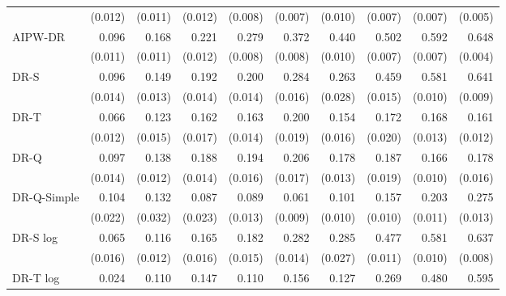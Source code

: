 \documentclass{article}
\begin{document}
\begin{table}[H]
\begin{tabular}{l|rrrrrrrrr}
 & \scriptsize (0.012) & \scriptsize (0.011) & \scriptsize (0.012) & \scriptsize (0.008) & \scriptsize (0.007) & \scriptsize (0.010) & \scriptsize (0.007) & \scriptsize (0.007) & \scriptsize (0.005) \\[2pt]
AIPW-DR & 0.096 & 0.168 & 0.221 & 0.279 & 0.372 & 0.440 & 0.502 & 0.592 & 0.648 \\
 & \scriptsize (0.011) & \scriptsize (0.011) & \scriptsize (0.012) & \scriptsize (0.008) & \scriptsize (0.008) & \scriptsize (0.010) & \scriptsize (0.007) & \scriptsize (0.007) & \scriptsize (0.004) \\[2pt]
\hline
DR-S & 0.096 & 0.149 & 0.192 & 0.200 & 0.284 & 0.263 & 0.459 & 0.581 & 0.641 \\
 & \scriptsize (0.014) & \scriptsize (0.013) & \scriptsize (0.014) & \scriptsize (0.014) & \scriptsize (0.016) & \scriptsize (0.028) & \scriptsize (0.015) & \scriptsize (0.010) & \scriptsize (0.009) \\[2pt]
DR-T & 0.066 & 0.123 & 0.162 & 0.163 & 0.200 & 0.154 & 0.172 & 0.168 & 0.161 \\
 & \scriptsize (0.012) & \scriptsize (0.015) & \scriptsize (0.017) & \scriptsize (0.014) & \scriptsize (0.019) & \scriptsize (0.016) & \scriptsize (0.020) & \scriptsize (0.013) & \scriptsize (0.012) \\[2pt]
DR-Q & 0.097 & 0.138 & 0.188 & 0.194 & 0.206 & 0.178 & 0.187 & 0.166 & 0.178 \\
 & \scriptsize (0.014) & \scriptsize (0.012) & \scriptsize (0.014) & \scriptsize (0.016) & \scriptsize (0.017) & \scriptsize (0.013) & \scriptsize (0.019) & \scriptsize (0.010) & \scriptsize (0.016) \\[2pt]
DR-Q-Simple & 0.104 & 0.132 & 0.087 & 0.089 & 0.061 & 0.101 & 0.157 & 0.203 & 0.275 \\
 & \scriptsize (0.022) & \scriptsize (0.032) & \scriptsize (0.023) & \scriptsize (0.013) & \scriptsize (0.009) & \scriptsize (0.010) & \scriptsize (0.010) & \scriptsize (0.011) & \scriptsize (0.013) \\[2pt]
\hline
DR-S log & 0.065 & 0.116 & 0.165 & 0.182 & 0.282 & 0.285 & 0.477 & 0.581 & 0.637 \\
 & \scriptsize (0.016) & \scriptsize (0.012) & \scriptsize (0.016) & \scriptsize (0.015) & \scriptsize (0.014) & \scriptsize (0.027) & \scriptsize (0.011) & \scriptsize (0.010) & \scriptsize (0.008) \\[2pt]
DR-T log & 0.024 & 0.110 & 0.147 & 0.110 & 0.156 & 0.127 & 0.269 & 0.480 & 0.595 \\

\end{tabular}
\end{table}
\end{document}
